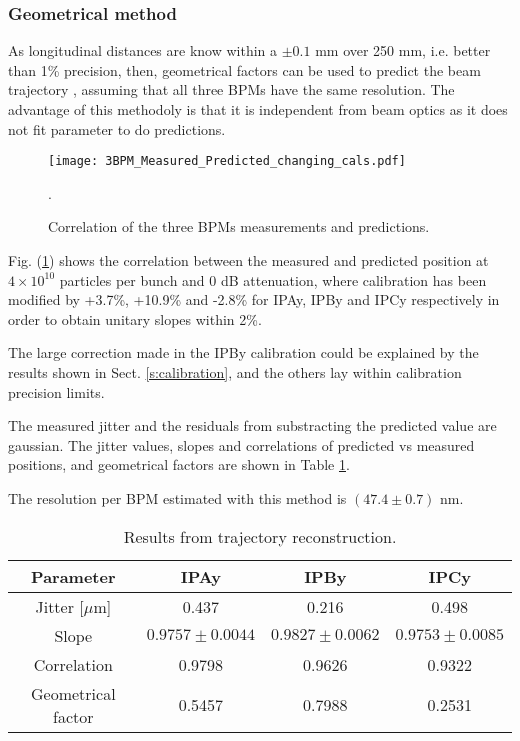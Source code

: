 \subsubsection{Geometrical method}
As longitudinal distances are know within a $\pm0.1$ mm over 250 mm, i.e. better than 1\% precision, then, geometrical factors can be used to predict the beam trajectory \cite{Nakamura:2008}, assuming that all three BPMs have the same resolution. The advantage of this methodoly is that it is independent from beam optics as it does not fit parameter to do predictions.\par
\begin{figure}[!htb]
\centering%
 \texttt{[image: 3BPM\_Measured\_Predicted\_changing\_cals.pdf]}\caption{Correlation of the three BPMs measurements and predictions.}\label{f:3BPMpredictions}.
\end{figure}
Fig. (\ref{f:3BPMpredictions}) shows the correlation between the measured and predicted position at $4\times10^{10}$ particles per bunch and 0 dB attenuation, where calibration has been modified by +3.7\%, +10.9\% and -2.8\% for IPAy, IPBy and IPCy respectively in order to obtain unitary slopes within 2\%.\par
The large correction made in the IPBy calibration could be explained by the results shown in Sect. \ref{s:calibration}, and the others lay within calibration precision limits.\par
The measured jitter and the residuals from substracting the predicted value are gaussian. The jitter values, slopes and correlations of predicted vs measured positions, and geometrical factors are shown in Table \ref{t:resodata}.\par
The resolution per BPM estimated with this method is $(47.4\pm0.7)$ nm.\par
\begin{table}[hbt]
\centering
\begin{tabular}{c||c|c|c}\hline
Parameter & IPAy & IPBy & IPCy\\ \hline\hline
Jitter [$\mu$m] & 0.437 & 0.216 & 0.498\\\hline
Slope & $0.9757\pm0.0044$ & $0.9827\pm0.0062$ & $0.9753\pm0.0085$\\\hline
Correlation & 0.9798 & 0.9626 & 0.9322 \\\hline
Geometrical factor & 0.5457 & 0.7988 & 0.2531\\\hline
\end{tabular}\caption{Results from trajectory reconstruction.}\label{t:resodata}
\end{table}
